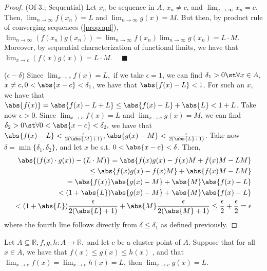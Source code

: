 \documentclass[12pt]{article}
\renewcommand{\qedsymbol}{$\blacksquare$}
\begin{document}
\begin{proof}(Of 3.; Sequential) Let $x_n$ be sequence in $A$, $x_n \neq c$, and $\lim_{n\to \infty} x_n = c$. Then, $\lim_{n\to\infty} f(x_n) = L$ and $\lim_{n \to \infty} g(x) = M$. But then, by product rule of converging sequences (\cref{prop:apl}), $\lim_{n\to\infty} (f(x_n)g(x_n)) = \lim_{n\to\infty} f(x_n) \lim_{n\to\infty}g(x_n) = L \cdot M$. Moreover, by sequential characterization of functional limits, we have that $\lim_{x \to c} (f(x)g(x)) = L \cdot M$.$\quad$ \qedsymbol

\noindent($\epsilon-\delta$) Since $\lim_{x\to c}f(x) = L,$ if we take $\epsilon = 1$, we can find $\delta_1 > 0 \st \forall x \in A$, $x \neq c, 0 < \abs{x - c} < \delta_1$, we have that $\abs{f(x) - L} < 1$. For such an $x$, we have that $\abs{f(x)} = \abs{f(x) - L + L} \leq \abs{f(x) - L} + \abs{L} < 1 + L$. Take now $\epsilon > 0$. Since $\lim_{x\to c} f(x) = L$ and $\lim_{x\to c} g(x) = M$, we can find $\delta_2 > 0 \st \forall 0 < \abs{x - c} < \delta_2,$ we have that $\abs{f(x) - L} < \frac{\epsilon}{2(\abs{M} +1)}, \abs{g(x) - M} < \frac{\epsilon}{2 (\abs{L} + 1)}$. Take now $\delta = \min\{\delta_1, \delta_2\}$, and let $x$ be s.t. $0 < \abs{x - c} < \delta$. Then, \begin{align*}
  \abs{(f(x)\cdot g(x)) - (L\cdot M)} = \abs{f(x)g(x) - f(x)M + f(x)M - LM} \\
  \leq \abs{f(x) g(x) - f(x)M} + \abs{f(x)M - LM}\\
  = \abs{f(x)}\abs{g(x) - M} + \abs{M}\abs{f(x) - L}\\
  < (1 + \abs{L})\abs{g(x) - M} + \abs{M}\abs{f(x) - L}\\
  < (1+\abs{L})\frac{\epsilon}{2(\abs{L}+1)} + \abs{M} \frac{\epsilon}{2(\abs{M}+1)} \leq \frac{\epsilon}{2} + \frac{\epsilon}{2} = \epsilon
\end{align*}
where the fourth line follows directly from $\delta \leq \delta_1$ as defined previously.
\end{proof}

\begin{theorem}\label{thm:functionalsqueeze}
  Let $A \subseteq \mathbb{R},f,g,h : A \to \mathbb{R},$ and let $c$ be a cluster point of $A$. Suppose that for all $x \in A$, we have that $f(x) \leq g(x) \leq h(x)$ , and that $\lim_{x\to c} f(x) = \lim_{x \to c} h(x) = L$, then $\lim_{x\to c} g(x) = L$.
\end{theorem}
\end{document}
